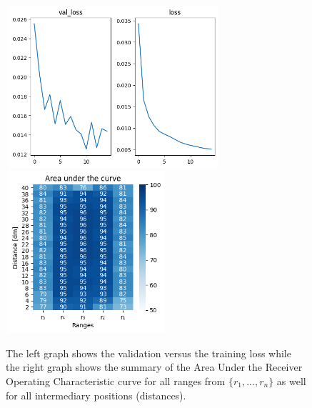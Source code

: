 \begin{multicols}{2}
\begin{itemize}
\end{itemize}
\end{multicols}\begin{figure}[H]%
\centering
\includegraphics[width=8cm,height=6cm]{3_models/models_48/graph_48.png}
\hspace{0.2 cm}
\includegraphics[width=6cm,height=6cm]{4_plots/plots_48/AUC_48.png}
\caption{The left graph shows the validation versus the training loss while the right graph shows the summary of the Area Under the Receiver Operating Characteristic curve for all ranges from $\{r_{1}, ... ,r_{n}\}$ as well for all intermediary positions (distances).}
\label{auc_48}
\end{figure}

\newpage
